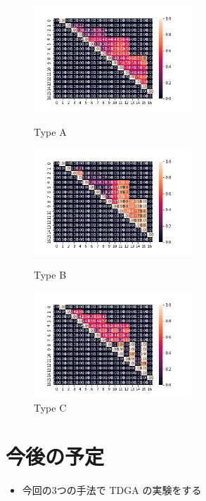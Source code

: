 \documentclass[twocolumn]{jarticle}     %
\begin{document}
\begin{figure}[tb]
 \begin{minipage}{0.33\hsize}
 	\begin{center}
    \includegraphics[clip,width=60mm]{al_a.png}
    \caption{Type A}
    \label{fig:a_r}
 	\end{center}
 \end{minipage}
 \begin{minipage}{0.33\hsize}
 	\begin{center}
    \includegraphics[clip,width=60mm]{al_b.png}
    \caption{Type B}
    \label{fig:b_r}
 	\end{center}
 \end{minipage}
 \begin{minipage}{0.33\hsize}
 	\begin{center}
    \includegraphics[clip,width=60mm]{al_c.png}
    \caption{Type C}
    \label{fig:c_r}
 	\end{center}
 \end{minipage}
\end{figure}




\section{今後の予定}
\begin{itemize}
  \item 今回の3つの手法で TDGA の実験をする
\end{itemize}



\end{document}
